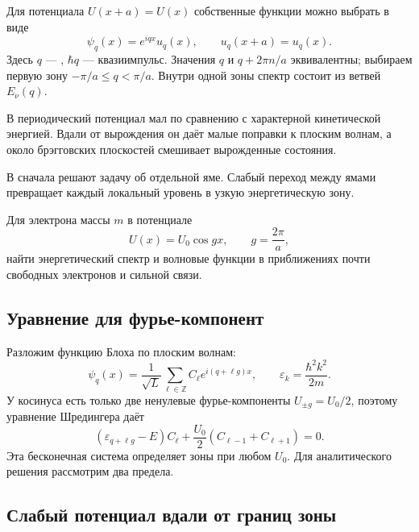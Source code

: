 \documentclass[../final.tex]{subfiles}
\begin{document}


Для потенциала $U(x+a)=U(x)$ собственные функции можно выбрать в виде
\[
    \psi_q(x)=e^{iqx}u_q(x),\qquad u_q(x+a)=u_q(x).
\]
Здесь $q$ --- , $\hbar q$ ---
квазиимпульс. Значения $q$ и $q+2\pi n/a$ эквивалентны;
выбираем первую зону $-\pi/a\le q<\pi/a$.
Внутри одной зоны спектр состоит из ветвей $E_\nu(q)$.

В  периодический
потенциал мал по сравнению с характерной кинетической энергией.
Вдали от вырождения он даёт малые поправки к плоским волнам,
а около брэгговских плоскостей смешивает вырожденные состояния.

В  сначала решают задачу
об отдельной яме. Слабый переход между ямами превращает каждый
локальный уровень в узкую энергетическую зону.

\begingroup
\renewcommand{\thesection}{7.\arabic{section}}
\label{task:fksv_mathieu}

\condition
Для электрона массы $m$ в потенциале
\[
    U(x)=U_0\cos gx,\qquad g=\frac{2\pi}{a},
\]
найти энергетический спектр и волновые функции в приближениях
почти свободных электронов и сильной связи.

\solution

\subsection*{Уравнение для фурье-компонент}

Разложим функцию Блоха по плоским волнам:
\[
    \psi_q(x)=\frac1{\sqrt L}\sum_{\ell\in\mathbb Z}
       C_\ell e^{i(q+\ell g)x},\qquad
    \varepsilon_k=\frac{\hbar^2k^2}{2m}.
\]
У косинуса есть только две ненулевые фурье-компоненты
$U_{\pm g}=U_0/2$, поэтому уравнение Шредингера даёт
\[
    (\varepsilon_{q+\ell g}-E)C_\ell
       +\frac{U_0}{2}(C_{\ell-1}+C_{\ell+1})=0.
\]
Эта бесконечная система определяет зоны при любом $U_0$.
Для аналитического решения рассмотрим два предела.

\subsection*{Слабый потенциал вдали от границ зоны}
\end{document}
